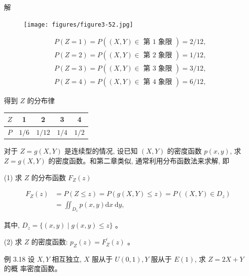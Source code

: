 \documentclass{beamer}
\begin{document}
	\begin{frame}
		解
			\begin{figure}
				\centering
				\texttt{[image: figures/figure3-52.jpg]}
			\end{figure}
		$$
		\begin{aligned}
			& P(Z=1)=P((X, Y) \in \text { 第 } 1 \text { 象限 })=2 / 12 \text {, } \\
			& P(Z=2)=P((X, Y) \in \text { 第 } 2 \text { 象限 })=1 / 12 \text {, } \\
			& P(Z=3)=P((X, Y) \in \text { 第 } 3 \text { 象限 })=3 / 12 \text {, } \\
			& P(Z=4)=P((X, Y) \in \text { 第 } 4 \text { 象限 })=6 / 12 \text {, }
		\end{aligned}
		$$
		
		得到 $Z$ 的分布律
		\begin{center}
		\begin{tabular}{c|cccc}
			$Z$ & 1 & 2 & 3 & 4 \\
			\hline
			$P$ & $1 / 6$ & $1 / 12$ & $1 / 4$ & $1 / 2$ \\
		\end{tabular}
		\end{center}
		
	\end{frame}
	
	\begin{frame}
		对于 $Z=g(X, Y)$ 是连续型的情况, 设已知 $(X, Y)$ 的密度函数 $p(x, y)$, 求 $Z=g(X, Y)$ 的密度函数。和第二章类似, 通常利用分布函数法来求解, 即
		
		(1) 求 $Z$ 的分布函数 $F_{Z}(z)$
		
		\begin{align}
				F_{Z}(z) & = P(Z \leqslant z)=P(g(X, Y) \leqslant z)=P\left((X, Y) \in D_{z}\right)\\
				&=\iint_{D_{z}} p(x, y) \mathrm{d} x \mathrm{~d} y,
		\end{align}
		
		其中, $D_{z}=\{(x, y) \mid g(x, y) \leqslant z\}$ 。
		
		(2) 求 $Z$ 的密度函数: $p_{Z}(z)=F_{Z}^{\prime}(z)$ 。
	\end{frame}
	\begin{frame}
		例 3.18 设 $X, Y$ 相互独立, $X$ 服从于 $U(0,1), Y$ 服从于 $E(1)$, 求 $Z=2 X+Y$ 的概 率密度函数。
	\end{frame}
	
\end{document}
